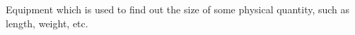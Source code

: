 Equipment which is used to find out the size of some physical quantity, such
as length, weight, etc.